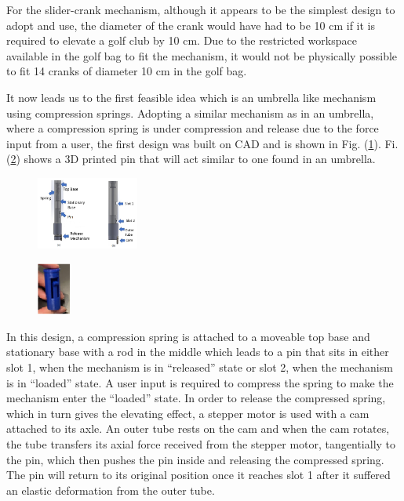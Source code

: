 \documentclass[11pt,landscape]{article}
\begin{document}
\begin{multicols}{3}
For
the slider-crank mechanism, although it appears to be the simplest design to
adopt and use, the diameter of the crank would have had to be 10 cm if it is
required to elevate a golf club by 10 cm. Due to the restricted workspace
available in the golf bag to fit the mechanism, it would not be physically
possible to fit 14 cranks of diameter 10 cm in the golf bag. 

It now leads us to
the first feasible idea which is an umbrella like mechanism using compression
springs. Adopting a similar mechanism as in an umbrella, where a compression
spring is under compression and release due to the force input from a user, the
first design was built on CAD and is shown in Fig. (\ref{fig:init_release_mech}).
Fi. (\ref{fig:pin}) shows a 3D printed pin that will act similar to one found in an
umbrella.

\begin{figure}[H]
    \begin{center}
        \includegraphics[width=0.3\textwidth]{Init Release Mech.PNG}
        \label{fig:init_release_mech}
    \end{center}
\end{figure}
\begin{figure}[H]
    \begin{center}
        \includegraphics[width=0.1\textwidth]{pin.PNG}
        \label{fig:pin}
    \end{center}
\end{figure}

In this design, a compression spring is attached to a moveable top base and
stationary base with a rod in the middle which leads to a pin that sits in
either slot 1, when the mechanism is in “released” state or slot 2, when the
mechanism is in “loaded” state. A user input is required to compress the spring
to make the mechanism enter the “loaded” state. In order to release the
compressed spring, which in turn gives the elevating effect, a stepper motor is
used with a cam attached to its axle. An outer tube rests on the cam and when
the cam rotates, the tube transfers its axial force received from the stepper
motor, tangentially to the pin, which then pushes the pin inside and releasing
the compressed spring. The pin will return to its original position once it
reaches slot 1 after it suffered an elastic deformation from the outer tube.


\end{multicols}
\end{document}

